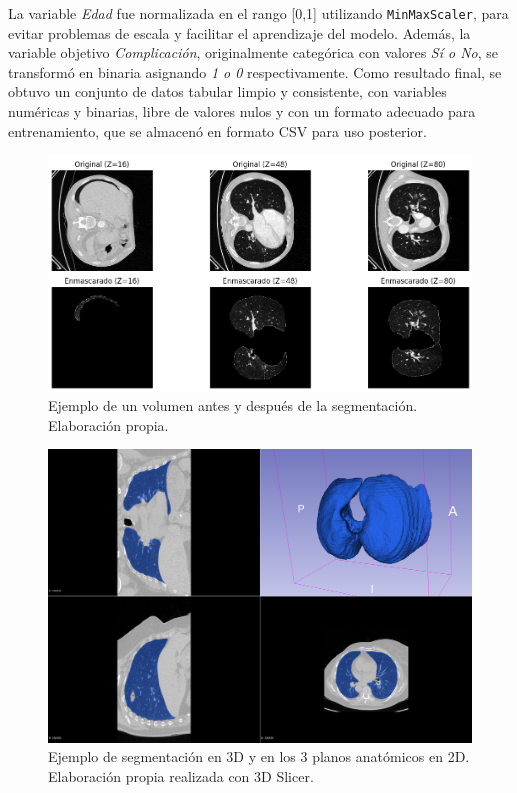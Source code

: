 La variable \textit{Edad} fue normalizada en el rango [0,1] utilizando \texttt{MinMaxScaler}, para evitar problemas de escala y facilitar el aprendizaje del modelo. Además, la variable objetivo \textit{Complicación}, originalmente categórica con valores \textit{Sí o No}, se transformó en binaria asignando \textit{1 o 0} respectivamente. Como resultado final, se obtuvo un conjunto de datos tabular limpio y consistente, con variables numéricas y binarias, libre de valores nulos y con un formato adecuado para entrenamiento, que se almacenó en formato CSV para uso posterior.

\begin{figure}[!htbp]
    \centering
    \includegraphics[width=1\textwidth]{img/ejemplo_segmentacion.png}
    \caption{Ejemplo de un volumen antes y después de la segmentación. Elaboración propia.}
    \label{fig:ejemplo-segmentacion}
\end{figure}

\begin{figure}[!htbp]
    \centering
    \includegraphics[width=1\textwidth]{img/segmentacion3D.png}
    \caption{Ejemplo de segmentación en 3D y en los 3 planos anatómicos en 2D. Elaboración propia realizada con 3D Slicer.}
    \label{fig:ejemplo-segmentacion3D}
\end{figure}


\endinput
